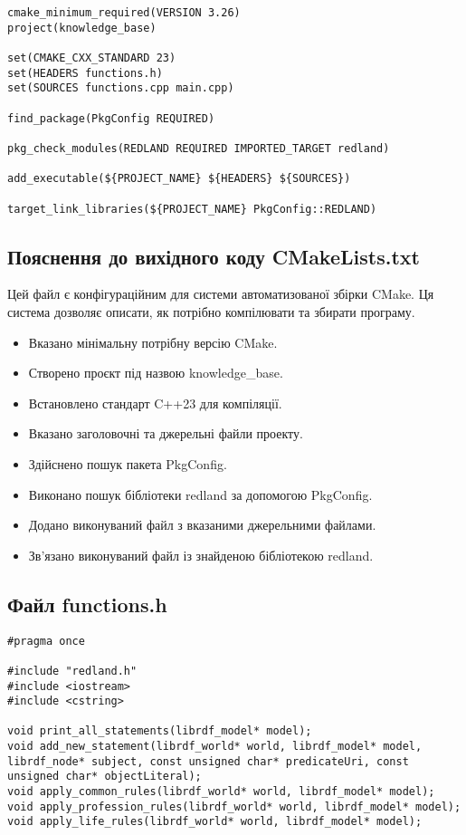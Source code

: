 \documentclass[12pt, a4paper]{article}
\begin{document}
\begin{verbatim}
cmake_minimum_required(VERSION 3.26)
project(knowledge_base)

set(CMAKE_CXX_STANDARD 23)
set(HEADERS functions.h)
set(SOURCES functions.cpp main.cpp)

find_package(PkgConfig REQUIRED)

pkg_check_modules(REDLAND REQUIRED IMPORTED_TARGET redland)

add_executable(${PROJECT_NAME} ${HEADERS} ${SOURCES})

target_link_libraries(${PROJECT_NAME} PkgConfig::REDLAND)
\end{verbatim}

\subsection{Пояснення до вихідного коду CMakeLists.txt}

Цей файл є конфігураційним для системи автоматизованої збірки CMake. Ця система дозволяє описати, як потрібно компілювати та збирати програму.

\begin{itemize}
    \item Вказано мінімальну потрібну версію CMake.
    \item Створено проєкт під назвою knowledge\_base.
    \item Встановлено стандарт C++23 для компіляції.
    \item Вказано заголовочні та джерельні файли проекту.
    \item Здійснено пошук пакета PkgConfig.
    \item Виконано пошук бібліотеки redland за допомогою PkgConfig.
    \item Додано виконуваний файл з вказаними джерельними файлами.
    \item Зв'язано виконуваний файл із знайденою бібліотекою redland.
\end{itemize}

\subsection{Файл functions.h}

\begin{verbatim}
#pragma once

#include "redland.h"
#include <iostream>
#include <cstring>

void print_all_statements(librdf_model* model);
void add_new_statement(librdf_world* world, librdf_model* model, librdf_node* subject, const unsigned char* predicateUri, const unsigned char* objectLiteral);
void apply_common_rules(librdf_world* world, librdf_model* model);
void apply_profession_rules(librdf_world* world, librdf_model* model);
void apply_life_rules(librdf_world* world, librdf_model* model);
\end{verbatim}
\end{document}
